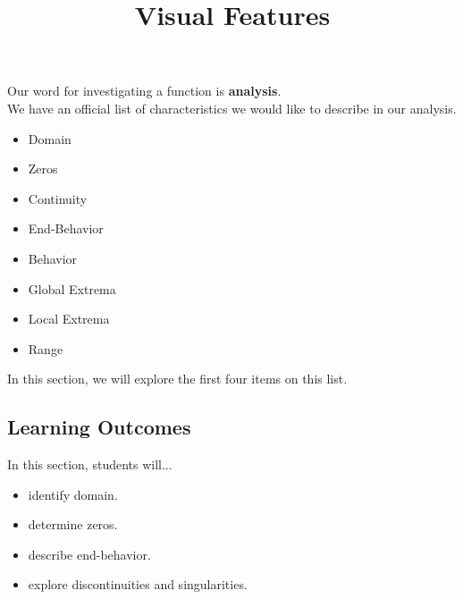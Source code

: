 \documentclass{ximera}
\title{Visual Features}
\begin{document}
\begin{abstract}
\end{abstract}
\maketitle




Our word for investigating a function is \textbf{\textcolor{blue!55!black}{analysis}}. \\

We have an official list of characteristics we would like to describe in our analysis. \\





\begin{itemize}
\item Domain
\item Zeros
\item Continuity
\item End-Behavior
\item Behavior
\item Global Extrema
\item Local Extrema
\item Range
\end{itemize}


In this section, we will explore the first four items on this list.









\subsection{Learning Outcomes}

\begin{sectionOutcomes}
In this section, students will...

\begin{itemize}
\item identify domain.
\item determine zeros.
\item describe end-behavior.
\item explore discontinuities and singularities.
\end{itemize}
\end{sectionOutcomes}
\end{document}
